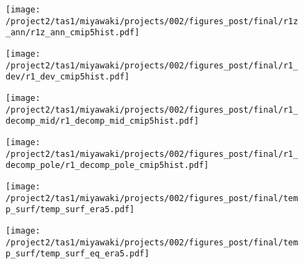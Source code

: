 \documentclass{ametsocV5}
\begin{document}
\begin{figure}[t]
  \noindent\texttt{[image: /project2/tas1/miyawaki/projects/002/figures\_post/final/r1z\_ann/r1z\_ann\_cmip5hist.pdf]}\\
  \label{fig:cmip5hist-r1-ann}
\end{figure}

\begin{figure}[t]
  \noindent\texttt{[image: /project2/tas1/miyawaki/projects/002/figures\_post/final/r1\_dev/r1\_dev\_cmip5hist.pdf]}\\
  \label{fig:cmip5hist-r1-dev}
\end{figure}

\begin{figure}[t]
  \noindent\texttt{[image: /project2/tas1/miyawaki/projects/002/figures\_post/final/r1\_decomp\_mid/r1\_decomp\_mid\_cmip5hist.pdf]}\\
  \label{fig:cmip5hist-r1-decomp-mid}
\end{figure}

\begin{figure}[t]
  \noindent\texttt{[image: /project2/tas1/miyawaki/projects/002/figures\_post/final/r1\_decomp\_pole/r1\_decomp\_pole\_cmip5hist.pdf]}\\
  \label{fig:cmip5hist-r1-decomp-pole}
\end{figure}

\begin{figure}[t]
  \noindent\texttt{[image: /project2/tas1/miyawaki/projects/002/figures\_post/final/temp\_surf/temp\_surf\_era5.pdf]}\\
  \label{fig:temp-surf-era5}
\end{figure}

\begin{figure}[t]
  \noindent\texttt{[image: /project2/tas1/miyawaki/projects/002/figures\_post/final/temp\_surf/temp\_surf\_eq\_era5.pdf]}\\
  \label{fig:temp-surf-eq-era5}
\end{figure}
\end{document}
